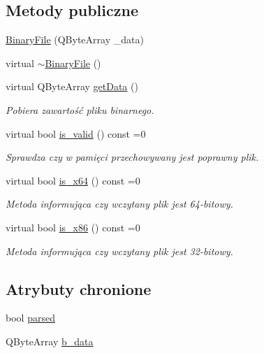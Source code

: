 \subsection*{Metody publiczne}
\begin{DoxyCompactItemize}
\item 
\hyperlink{class_binary_file_a1afe5dffc5edf5f25ea22deef606eb4b}{Binary\-File} (Q\-Byte\-Array \-\_\-data)
\item 
virtual \hyperlink{class_binary_file_a8ff1b2e140421fd040bff0854c1322ff}{$\sim$\-Binary\-File} ()
\item 
virtual Q\-Byte\-Array \hyperlink{class_binary_file_a5ffee8a6230cf3c82cf6ee0e9fb53048}{get\-Data} ()
\begin{DoxyCompactList}\small\item\em Pobiera zawartość pliku binarnego. \end{DoxyCompactList}\item 
virtual bool \hyperlink{class_binary_file_a6007435bc4451bb80a3169d977f4f125}{is\-\_\-valid} () const =0
\begin{DoxyCompactList}\small\item\em Sprawdza czy w pamięci przechowywany jest poprawny plik. \end{DoxyCompactList}\item 
virtual bool \hyperlink{class_binary_file_a36b7998c72bbee68ab492d93368c14ca}{is\-\_\-x64} () const =0
\begin{DoxyCompactList}\small\item\em Metoda informująca czy wczytany plik jest 64-\/bitowy. \end{DoxyCompactList}\item 
virtual bool \hyperlink{class_binary_file_aa7d43cde4ab8cc9723d2b5c769719bd9}{is\-\_\-x86} () const =0
\begin{DoxyCompactList}\small\item\em Metoda informująca czy wczytany plik jest 32-\/bitowy. \end{DoxyCompactList}\end{DoxyCompactItemize}
\subsection*{Atrybuty chronione}
\begin{DoxyCompactItemize}
\item 
bool \hyperlink{class_binary_file_ae16774932979ddb6d57b46b3c387a159}{parsed}
\item 
Q\-Byte\-Array \hyperlink{class_binary_file_acdfdb2fae63d8395dfa899be21bd8036}{b\-\_\-data}
\end{DoxyCompactItemize}


